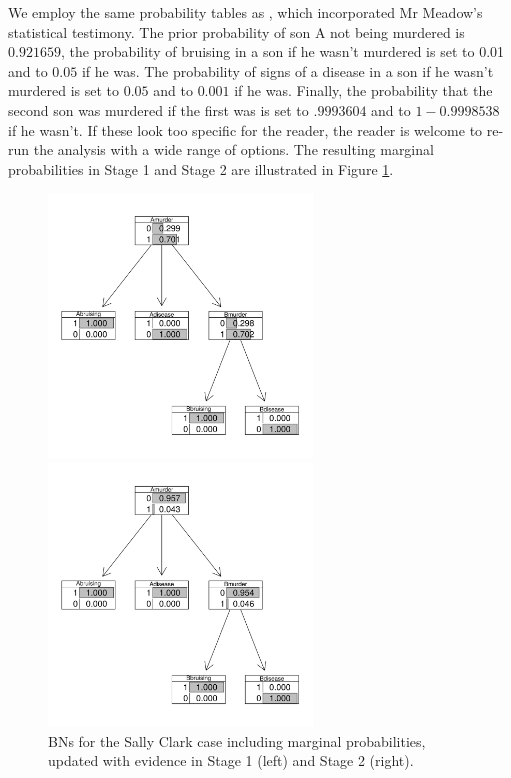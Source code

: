 \documentclass[10pt,]{scrartcl}
\begin{document}
We employ the same probability tables as \citet{Fenton2018Risk}, which incorporated Mr Meadow's statistical testimony. The prior probability of son A not being murdered is $0.921659$, the probability of bruising in a son if he wasn't murdered is set to 0.01 and to $0.05$ if he was. The probability of signs of a disease in a son if he wasn't murdered is set to $0.05$ and to $0.001$ if he was. Finally, the probability that the second son was murdered if the first was is set to $.9993604$ and to $1-0.9998538$ if he wasn't. If these look too specific for the reader, the reader is welcome to re-run the analysis with a wide range of options. The resulting marginal probabilities in Stage 1 and Stage 2 are illustrated in Figure \ref{fig:sc}.





\begin{figure}[H]
\begin{minipage}{.5\textwidth} %
    \includegraphics[width = 7cm]{../images/scBN1.png}\end{minipage} %
\begin{minipage}{.5\textwidth} %
    \includegraphics[width = 7cm]{../images/scBN2.png}
\end{minipage}
    \caption{BNs for the Sally Clark case including marginal probabilities, updated with evidence in Stage 1 (left) and Stage 2 (right).}
    \label{fig:sc}
\end{figure}
\end{document}
